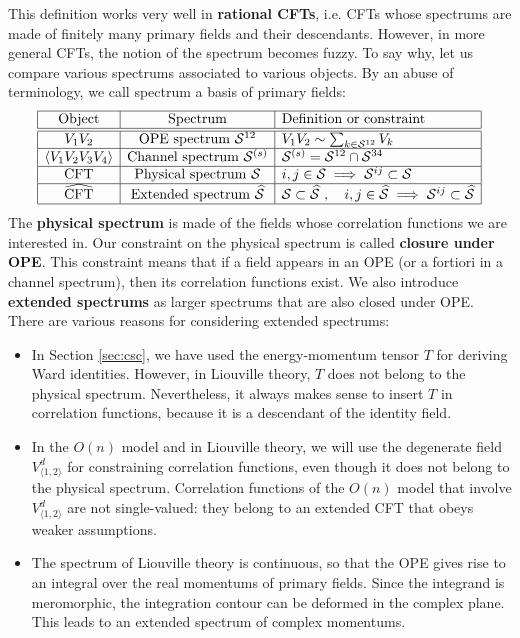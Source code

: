 \documentclass[12pt, a4paper]{article}
\newcommand{\myindex}[1]{\textbf{\boldmath #1}}
\begin{document}
This definition works very well in \myindex{rational CFTs}, i.e. CFTs whose spectrums are made of finitely many primary fields and their descendants. However, in more general CFTs, the notion of the spectrum becomes fuzzy. To say why, let us compare various spectrums associated to various objects. By an abuse of terminology, we call spectrum a basis of primary fields: 
\begin{align}
 \begin{array}{|c|c|l|}
  \hline 
  \text{Object} & \text{Spectrum}  & \text{Definition or constraint}
  \\
  \hline \hline 
  V_1V_2 & \text{OPE spectrum } \mathcal{S}^{12} & V_1V_2 \sim \sum_{k\in \mathcal{S}^{12}} V_k 
  \\
  \hline 
  \left<V_1V_2V_3V_4\right> & \text{Channel spectrum } \mathcal{S}^{(s)} &  \mathcal{S}^{(s)}= \mathcal{S}^{12}\cap \mathcal{S}^{34}
  \\
  \hline 
  \text{CFT} & \text{Physical spectrum } \mathcal{S} &  i,j\in\mathcal{S}\implies \mathcal{S}^{ij}\subset \mathcal{S}  
  \\
  \hline 
  \widehat{\text{CFT}} & \text{Extended spectrum } \widehat{\mathcal{S}} & \mathcal{S}\subset \widehat{\mathcal{S}}\ , \quad i,j\in\widehat{\mathcal{S}}\implies \mathcal{S}^{ij}\subset \widehat{\mathcal{S}}
  \\
  \hline 
 \end{array}
 \label{specs}
\end{align}
The \myindex{physical spectrum} is made of the fields whose correlation functions we are interested in. Our constraint on the physical spectrum is called \myindex{closure under OPE}. This constraint means that if a field appears in an OPE (or a fortiori in a channel spectrum), then its correlation functions exist. 
We also introduce \myindex{extended spectrums} as larger spectrums that are also closed under OPE. There are various reasons for considering extended spectrums:
\begin{itemize}
 \item In Section \ref{sec:csc}, we have used the energy-momentum tensor $T$ for deriving Ward identities. However, in Liouville theory, $T$ does not belong to the physical spectrum. Nevertheless, it always makes sense to insert $T$ in correlation functions, because it is a descendant of the identity field. 
 \item In the $O(n)$ model and in Liouville theory, we will use the degenerate field $V^d_{\langle 1,2\rangle}$ for constraining correlation functions, even though it does not belong to the physical spectrum. Correlation functions of the $O(n)$ model that involve $V^d_{\langle 1,2\rangle}$ are not single-valued: they belong to an extended CFT that obeys weaker assumptions. 
 \item The spectrum of Liouville theory is continuous, so that the OPE gives rise to an integral over the real momentums of primary fields. Since the integrand is meromorphic, the integration contour can be deformed in the complex plane. This leads to an extended spectrum of complex momentums. 
\end{itemize}
\end{document}
